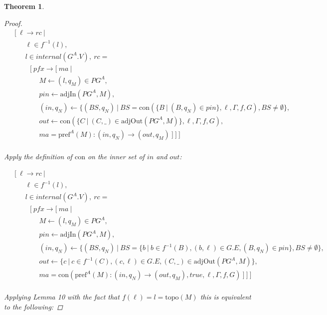 \documentclass[twocolumn, openany]{sig-alternate-10pt}
\newcommand{\Con}{\mathrm{con}}
\newcommand{\Pref}{\ensuremath{\mathrm{pref}}}
\newcommand{\Topo}{\ensuremath{\mathrm{topo}}}
\newtheorem{thm}{Theorem}
\begin{document}
\begin{thm}
\begin{proof}
    \[ \begin{array}{l}
     ~~~~~ [~ \ell \rightarrow rc ~\vert~ \\
     ~~~~~~~~~~~~ \ell \in f^{-1}(l), \\
     ~~~~~~~~~~~~ l \in internal(G^A.V), ~rc =  \\
     ~~~~~~~~~~~~~~~ [~ pfx \rightarrow [~ ma ~\vert~ \\
     ~~~~~~~~~~~~~~~~~~~~~ M \leftarrow (l,q_M) \in PG^A, \\
     ~~~~~~~~~~~~~~~~~~~~~ pin \leftarrow \text{adjIn}(PG^A,M), \\
     ~~~~~~~~~~~~~~~~~~~~~ (in,q_N) \leftarrow \{ (BS,q_N) ~\vert~ BS=\Con(\{B ~\vert~ (B,q_N) \in pin \}, \ell, \Gamma, f, G), BS \neq \emptyset \}, \\
     ~~~~~~~~~~~~~~~~~~~~~ out \leftarrow \Con(\{ C ~\vert~ (C,\_) \in \text{adjOut}(PG^A,M) \}, \ell,\Gamma,f,G), \\
     ~~~~~~~~~~~~~~~~~~~~~ ma = \Pref^A(M) : (in,q_N) \rightarrow (out,q_M) ~] ~] ~] \\
  \end{array} \]%

  Apply the definition of $\Con$ on the inner set of $in$ and $out$:

    \[ \begin{array}{l}
     ~~~~~ [~ \ell \rightarrow rc ~\vert~ \\
     ~~~~~~~~~~~~ \ell \in f^{-1}(l), \\
     ~~~~~~~~~~~~ l \in internal(G^A.V), ~rc =  \\
     ~~~~~~~~~~~~~~~ [~ pfx \rightarrow [~ ma ~\vert~ \\
     ~~~~~~~~~~~~~~~~~~~~~ M \leftarrow (l,q_M) \in PG^A, \\
     ~~~~~~~~~~~~~~~~~~~~~ pin \leftarrow \text{adjIn}(PG^A,M), \\
     ~~~~~~~~~~~~~~~~~~~~~ (in,q_N) \leftarrow \{ (BS,q_N) ~\vert~ BS=\{b ~\vert~ b \in f^{-1}(B), (b,\ell)\in G.E, (B,q_N) \in pin \}, BS \neq \emptyset \}, \\
     ~~~~~~~~~~~~~~~~~~~~~ out \leftarrow \{ c ~\vert~ c \in f^{-1}(C), (c,\ell)\in G.E, (C,\_) \in \text{adjOut}(PG^A,M) \}, \\
     ~~~~~~~~~~~~~~~~~~~~~ ma = \Con(\Pref^A(M) : (in,q_N) \rightarrow (out,q_M), true, \ell, \Gamma, f, G) ~] ~] ~] \\
  \end{array} \]%

  Applying Lemma 10 with the fact that $f(\ell) = l = \Topo(M)$ this is equivalent to the following:


\end{proof}
\end{thm}
\end{document}
